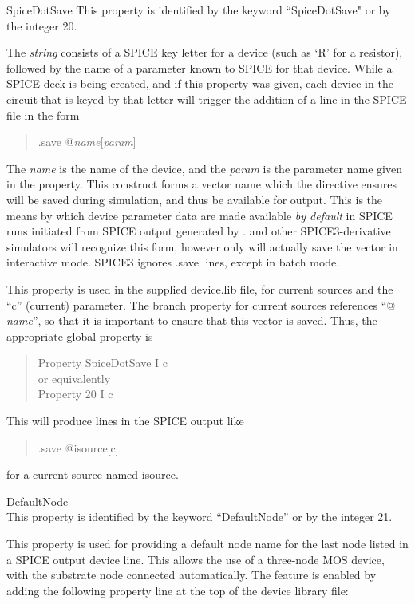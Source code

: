 \begin{description}
\item{\vt SpiceDotSave}
This property is identified by the keyword ``{\vt SpiceDotSave}" or by
the integer 20.

The {\it string} consists of a SPICE key letter for a device (such as
`{\vt R}' for a resistor), followed by the name of a parameter known
to SPICE for that device.  While a SPICE deck is being created, and if
this property was given, each device in the circuit that is keyed by
that letter will trigger the addition of a line in the SPICE file in
the form
\begin{quote}
{\vt .save @}{\it name\/}[{\it param\/}]
\end{quote}
The {\it name} is the name of the device, and the {\it param} is the
parameter name given in the property.  This construct forms a vector
name which the directive ensures will be saved during simulation, and
thus be available for output.  This is the means by which device
parameter data are made available {\it by default} in SPICE runs
initiated from SPICE output generated by {\Xic}.  {\WRspice} and other
SPICE3-derivative simulators will recognize this form, however only
{\WRspice} will actually save the vector in interactive mode.  SPICE3
ignores {\vt .save} lines, except in batch mode.

This property is used in the supplied {\vt device.lib} file, for
current sources and the ``{\vt c}'' (current) parameter.  The {\cb
branch} property for current sources references ``{\vt @}{\it
name\/}{\vt [c]}'', so that it is important to ensure that this vector
is saved.  Thus, the appropriate global property is
\begin{quote}
{\vt Property SpiceDotSave I c}\\
or equivalently\\
{\vt Property 20 I c}
\end{quote}
This will produce lines in the SPICE output like
\begin{quote}
{\vt .save @isource[c]}
\end{quote}
for a current source named {\vt isource}.

\item{\vt DefaultNode}\\
This property is identified by the keyword ``{\vt DefaultNode}''
or by the integer 21.

This property is used for providing a default node name for the last
node listed in a SPICE output device line.  This allows the use of a
three-node MOS device, with the substrate node connected
automatically.  The feature is enabled by adding the following
property line at the top of the device library file:


\end{description}
